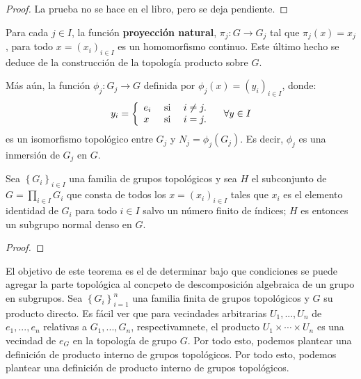 \documentclass[12pt]{report}
\theoremstyle{largebreak}
\newcommand{\cf}[3]{\ensuremath{#1:#2\rightarrow#3}}
\begin{document}
    \begin{proof}
        La prueba no se hace en el libro, pero se deja pendiente.
    \end{proof}

    \begin{obs}
        Para cada $j\in I$, la función \textbf{proyección natural}, $\cf{\pi_j}{G}{G_j}$ tal que $\pi_j(x)=x_j$, para todo $x=\left(x_i\right)_{i\in I}$ es un homomorfismo continuo. Este último hecho se deduce de la construcción de la topología producto sobre $G$.

        Más aún, la función $\cf{\phi_j}{G_j}{G}$ definida por $\phi_j(x)=\left(y_i \right)_{ i\in I}$, donde:
        \begin{equation*}
            y_i=\left\{
                \begin{array}{lcr}
                    e_i & \textup{ si } & i \neq j.\\
                    x & \textup{ si } & i = j.\\
                \end{array}
            \right.\quad\forall y\in I
        \end{equation*}
        es un isomorfismo topológico entre $G_j$ y $N_j=\phi_j(G_j)$. Es decir, $\phi_j$ es una inmersión de $G_j$ en $G$.
    \end{obs}

    \begin{theor}
        Sea $\left\{G_i \right\}_{ i\in I}$ una familia de grupos topológicos y sea $H$ el subconjunto de $G=\prod_{ i\in I}G_i$ que consta de todos los $x=\left(x_i \right)_{ i\in I}$ tales que $x_i$ es el elemento identidad de $G_i$ para todo $i\in I$ salvo un número finito de índices; $H$ es entonces un subgrupo normal denso en $G$.
    \end{theor}

    \begin{proof}
        
    \end{proof}

    El objetivo de este teorema es el de determinar bajo que condiciones se puede agregar la parte topológica al concpeto de descomposición algebraica de un grupo en subgrupos. Sea $\left\{G_i \right\}_{i=1}^n$ una familia finita de grupos topológicos y $G$ su producto directo. Es fácil ver que para vecindades arbitrarias $U_1,...,U_n$ de $e_1,...,e_n$ relativas a $G_1,...,G_n$, respectivamnete, el producto $U_1\times\cdots\times U_n$ es una vecindad de $e_G$ en la topología de grupo $G$. Por todo esto, podemos plantear una definición de producto interno de grupos topológicos. Por todo esto, podemos plantear una definición de producto interno de grupos topológicos.
\end{document}
